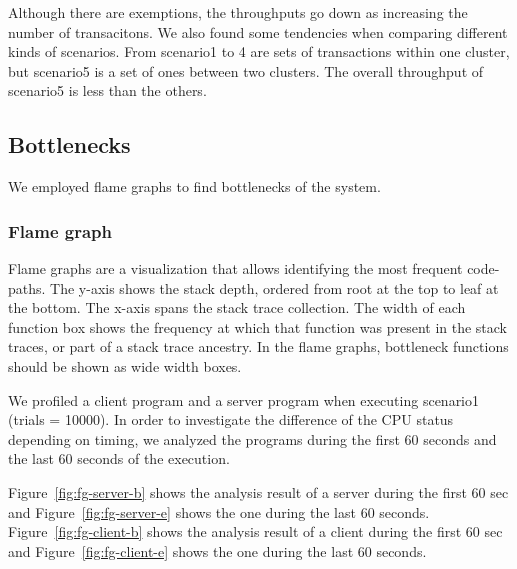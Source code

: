 \documentclass[a4paper, oneside]{discothesis}
\begin{document}
\begin{table}[t]
\begin{center}
\begin{tabular}{c}
        \end{tabular}
    \end{center}
\end{table}


Although there are exemptions, the throughputs go down as increasing the number of transacitons.
We also found some tendencies when comparing different kinds of scenarios.
From scenario1 to 4 are sets of transactions within one cluster,
but scenario5 is a set of ones between two clusters.
The overall throughput of scenario5 is less than the others.



\subsection{Bottlenecks}
We employed flame graphs to find bottlenecks of the system.

\subsubsection{Flame graph}
Flame graphs are a visualization that allows identifying the most frequent code-paths.
The y-axis shows the stack depth, ordered from root at the top to leaf at the bottom.
The x-axis spans the stack trace collection.
The width of each function box shows the frequency at which that function was present
in the stack traces, or part of a stack trace ancestry.
In the flame graphs, bottleneck functions should be shown as wide width boxes.

We profiled a client program and a server program when executing scenario1 (trials = 10000).
In order to investigate the difference of the CPU status depending on timing,
we analyzed the programs during the first 60 seconds and the last 60 seconds of the execution.

Figure~\ref{fig:fg-server-b} shows the analysis result of a server during the first 60 sec and
Figure~\ref{fig:fg-server-e} shows the one during the last 60 seconds.
Figure~\ref{fig:fg-client-b} shows the analysis result of a client during the first 60 sec and
Figure~\ref{fig:fg-client-e} shows the one during the last 60 seconds.
\end{document}
